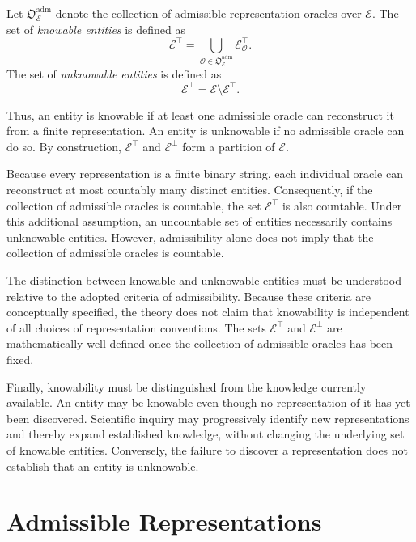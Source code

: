 \begin{definition}
\label{def:knowable_entity}
Let $\mathfrak{O}_{\mathcal{E}}^{\mathrm{adm}}$ denote the collection of admissible representation oracles over $\mathcal{E}$. The set of \emph{knowable entities} is defined as
\[
\mathcal{E}^{\top} = \bigcup_{\mathcal{O}\in \mathfrak{O}_{\mathcal{E}}^{\mathrm{adm}}}
\mathcal{E}_{\mathcal{O}}^{\top}.
\]
The set of \emph{unknowable entities} is defined as
\[
\mathcal{E}^{\bot} = \mathcal{E}\setminus\mathcal{E}^{\top}.
\]
\end{definition}

Thus, an entity is knowable if at least one admissible oracle can reconstruct it from a finite representation. An entity is unknowable if no admissible oracle can do so. By construction, $\mathcal{E}^{\top}$ and $\mathcal{E}^{\bot}$ form a partition of $\mathcal{E}$.

Because every representation is a finite binary string, each individual oracle can reconstruct at most countably many distinct entities. Consequently, if the collection of admissible oracles is countable, the set $\mathcal{E}^{\top}$ is also countable. Under this additional assumption, an uncountable set of entities necessarily contains unknowable entities. However, admissibility alone does not imply that the collection of admissible oracles is countable.

The distinction between knowable and unknowable entities must be understood relative to the adopted criteria of admissibility. Because these criteria are conceptually specified, the theory does not claim that knowability is independent of all choices of representation conventions. The sets $\mathcal{E}^{\top}$ and $\mathcal{E}^{\bot}$ are mathematically well-defined once the collection of admissible oracles has been fixed.

Finally, knowability must be distinguished from the knowledge currently available. An entity may be knowable even though no representation of it has yet been discovered. Scientific inquiry may progressively identify new representations and thereby expand established knowledge, without changing the underlying set of knowable entities. Conversely, the failure to discover a representation does not establish that an entity is unknowable.

%
%

\section{Admissible Representations}
\label{sec:admissible_representations}


